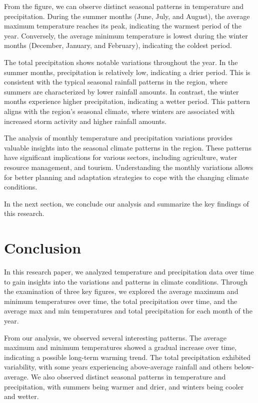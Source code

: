 \documentclass{article}
\begin{document}
\begin{enumerate}
From the figure, we can observe distinct seasonal patterns in temperature and precipitation. During the summer months (June, July, and August), the average maximum temperature reaches its peak, indicating the warmest period of the year. Conversely, the average minimum temperature is lowest during the winter months (December, January, and February), indicating the coldest period.

The total precipitation shows notable variations throughout the year. In the summer months, precipitation is relatively low, indicating a drier period. This is consistent with the typical seasonal rainfall patterns in the region, where summers are characterized by lower rainfall amounts. In contrast, the winter months experience higher precipitation, indicating a wetter period. This pattern aligns with the region's seasonal climate, where winters are associated with increased storm activity and higher rainfall amounts.

The analysis of monthly temperature and precipitation variations provides valuable insights into the seasonal climate patterns in the region. These patterns have significant implications for various sectors, including agriculture, water resource management, and tourism. Understanding the monthly variations allows for better planning and adaptation strategies to cope with the changing climate conditions.

In the next section, we conclude our analysis and summarize the key findings of this research.

\section{Conclusion}

In this research paper, we analyzed temperature and precipitation data over time to gain insights into the variations and patterns in climate conditions. Through the examination of three key figures, we explored the average maximum and minimum temperatures over time, the total precipitation over time, and the average max and min temperatures and total precipitation for each month of the year.

From our analysis, we observed several interesting patterns. The average maximum and minimum temperatures showed a gradual increase over time, indicating a possible long-term warming trend. The total precipitation exhibited variability, with some years experiencing above-average rainfall and others below-average. We also observed distinct seasonal patterns in temperature and precipitation, with summers being warmer and drier, and winters being cooler and wetter.


\end{enumerate}
\end{document}

